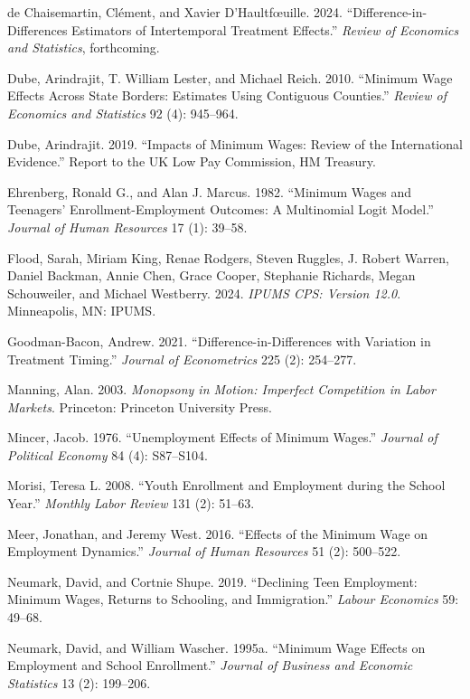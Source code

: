 \documentclass[12pt]{article}
\begin{document}
\noindent de Chaisemartin, Cl\'ement, and Xavier D'Haultf{\oe}uille. 2024. ``Difference-in-Differences Estimators of Intertemporal Treatment Effects.'' \textit{Review of Economics and Statistics}, forthcoming.

\noindent Dube, Arindrajit, T. William Lester, and Michael Reich. 2010. ``Minimum Wage Effects Across State Borders: Estimates Using Contiguous Counties.'' \textit{Review of Economics and Statistics} 92 (4): 945--964.

\noindent Dube, Arindrajit. 2019. ``Impacts of Minimum Wages: Review of the International Evidence.'' Report to the UK Low Pay Commission, HM Treasury.

\noindent Ehrenberg, Ronald G., and Alan J. Marcus. 1982. ``Minimum Wages and Teenagers' Enrollment-Employment Outcomes: A Multinomial Logit Model.'' \textit{Journal of Human Resources} 17 (1): 39--58.

\noindent Flood, Sarah, Miriam King, Renae Rodgers, Steven Ruggles, J. Robert Warren, Daniel Backman, Annie Chen, Grace Cooper, Stephanie Richards, Megan Schouweiler, and Michael Westberry. 2024. \textit{IPUMS CPS: Version 12.0}. Minneapolis, MN: IPUMS.

\noindent Goodman-Bacon, Andrew. 2021. ``Difference-in-Differences with Variation in Treatment Timing.'' \textit{Journal of Econometrics} 225 (2): 254--277.

\noindent Manning, Alan. 2003. \textit{Monopsony in Motion: Imperfect Competition in Labor Markets}. Princeton: Princeton University Press.

\noindent Mincer, Jacob. 1976. ``Unemployment Effects of Minimum Wages.'' \textit{Journal of Political Economy} 84 (4): S87--S104.

\noindent Morisi, Teresa L. 2008. ``Youth Enrollment and Employment during the School Year.'' \textit{Monthly Labor Review} 131 (2): 51--63.

\noindent Meer, Jonathan, and Jeremy West. 2016. ``Effects of the Minimum Wage on Employment Dynamics.'' \textit{Journal of Human Resources} 51 (2): 500--522.

\noindent Neumark, David, and Cortnie Shupe. 2019. ``Declining Teen Employment: Minimum Wages, Returns to Schooling, and Immigration.'' \textit{Labour Economics} 59: 49--68.

\noindent Neumark, David, and William Wascher. 1995a. ``Minimum Wage Effects on Employment and School Enrollment.'' \textit{Journal of Business and Economic Statistics} 13 (2): 199--206.
\end{document}
